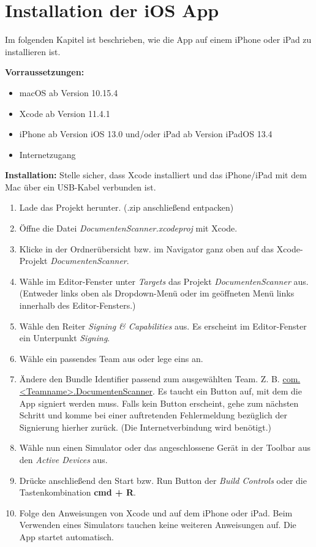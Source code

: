 \documentclass[notables, nomenclature, oneside, 150]{HSMW-Thesis}
\begin{document}
	
\chapter{Installation der iOS App}\label{ch:installation}
	Im folgenden Kapitel ist beschrieben, wie die App auf einem iPhone oder iPad zu installieren ist.
	
	\textbf{Vorraussetzungen:}
	\begin{itemize}
		\item macOS ab Version 10.15.4 
		\item Xcode ab Version 11.4.1 
		\item iPhone ab Version iOS 13.0 und/oder iPad ab Version iPadOS 13.4 
		\item Internetzugang
	\end{itemize}
	
	\textbf{Installation:}
	Stelle sicher, dass Xcode installiert und das iPhone/iPad mit dem Mac über ein USB-Kabel verbunden ist.
	\begin{enumerate}
		\item Lade das Projekt herunter. (.zip anschließend entpacken)
		\item Öffne die Datei \textit{DocumentenScanner.xcodeproj} mit Xcode.
		\item Klicke in der Ordnerübersicht bzw. im Navigator ganz oben auf das Xcode-Projekt \textit{DocumentenScanner}.
		\item Wähle im Editor-Fenster unter \textit{Targets} das Projekt \textit{DocumentenScanner} aus. (Entweder links oben als Dropdown-Menü oder im geöffneten Menü links innerhalb des Editor-Fensters.)
		\item Wähle den Reiter \textit{Signing \& Capabilities} aus. Es erscheint im Editor-Fenster ein Unterpunkt \textit{Signing}.
		\item Wähle ein passendes Team aus oder lege eins an.
		\item Ändere den Bundle Identifier passend zum ausgewählten Team. Z. B. \url{com.<Teamname>.DocumentenScanner}. Es taucht ein Button auf, mit dem die App signiert werden muss. Falls kein Button erscheint, gehe zum nächsten Schritt und komme bei einer auftretenden Fehlermeldung bezüglich der Signierung hierher zurück. (Die Internetverbindung wird benötigt.)
		\item Wähle nun einen Simulator oder das angeschlossene Gerät in der Toolbar aus den \textit{Active Devices} aus.
		\item Drücke anschließend den Start bzw. Run Button der \textit{Build Controls} oder die Tastenkombination \textbf{cmd + R}.
		\item Folge den Anweisungen von Xcode und auf dem iPhone oder iPad. Beim Verwenden eines Simulators tauchen keine weiteren Anweisungen auf. Die App startet automatisch. 
	\end{enumerate}
	
\end{document}
